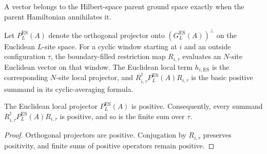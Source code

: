 \begin{lemma}
    \label{lem:mem_parent_ground_space_es}
    \leanok
    A vector belongs to the Hilbert-space parent ground space exactly when the
    parent Hamiltonian annihilates it.
\end{lemma}

\begin{remark}
    \label{rem:euclidean_local_projector_ingredients}
    \leanok
    Let $P_L^{\mathrm{ES}}(A)$ denote the orthogonal projector onto
    $(G_L^{\mathrm{ES}}(A))^\perp$ on the Euclidean $L$-site space. For a cyclic
    window starting at $i$ and an outside configuration $\tau$, the
    boundary-filled restriction map $R_{i,\tau}$ evaluates an $N$-site
    Euclidean vector on that window. The Euclidean local term
    $h_{i,\mathrm{ES}}$ is the corresponding
    $N$-site local projector, and $R_{i,\tau}^{\dagger} P_L^{\mathrm{ES}}(A) R_{i,\tau}$ is
    the basic positive summand in its cyclic-averaging formula.
\end{remark}

\begin{lemma}
    \label{lem:euclidean_local_projector_positive}
    \leanok
    The Euclidean local projector $P_L^{\mathrm{ES}}(A)$ is positive. Consequently,
    every summand $R_{i,\tau}^{\dagger} P_L^{\mathrm{ES}}(A) R_{i,\tau}$ is positive, and so
    is the finite sum over $\tau$.
\end{lemma}

\begin{proof}
    \leanok
    Orthogonal projectors are positive. Conjugation by $R_{i,\tau}$ preserves
    positivity, and finite sums of positive operators remain positive.
\end{proof}

